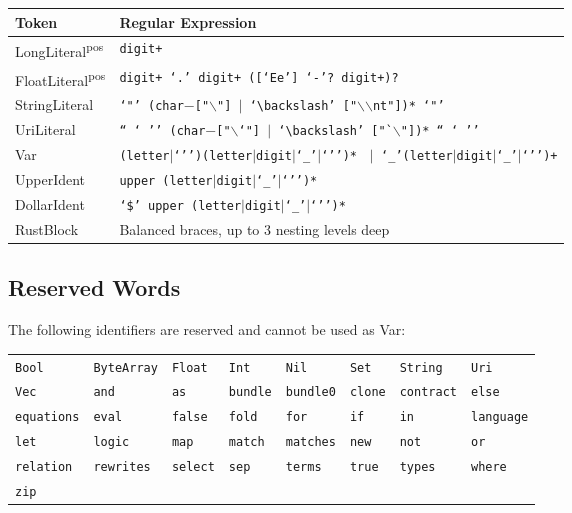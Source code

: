 \documentclass[11pt,a4paper]{article}
\newcommand{\kw}[1]{\texttt{\textcolor{kw}{#1}}}       %
\newcommand{\tok}[1]{\textsf{#1}}                       %
\newcommand{\OR}{\ensuremath{\;\mid\;}}                  %
\begin{document}
\begin{longtable}{@{}lp{10cm}@{}}
\toprule
\textbf{Token} & \textbf{Regular Expression} \\
\midrule
\endhead
\tok{LongLiteral}\textsuperscript{pos}
  & \texttt{digit+} \\[4pt]
\tok{FloatLiteral}\textsuperscript{pos}
  & \texttt{digit+ `.' digit+ ({[}`Ee'{]} `-'? digit+)?} \\[4pt]
\tok{StringLiteral}
  & \texttt{`"' (char$-${[}"$\backslash$"{]}~$|$~`$\backslash$' {[}"$\backslash$$\backslash$nt"{]})* `"'} \\[4pt]
\tok{UriLiteral}
  & \texttt{`` ` '' (char$-${[}"$\backslash$`"{]}~$|$~`$\backslash$' {[}"`$\backslash$"{]})* `` ` ''} \\[4pt]
\tok{Var}
  & \texttt{(letter$|$`'')(letter$|$digit$|$`\_'$|$`'')*}
    \OR \texttt{`\_'(letter$|$digit$|$`\_'$|$`'')+} \\[4pt]
\tok{UpperIdent}
  & \texttt{upper\,(letter$|$digit$|$`\_'$|$`'')*} \\[4pt]
\tok{DollarIdent}
  & \texttt{`\$'\,upper\,(letter$|$digit$|$`\_'$|$`'')*} \\[4pt]
\tok{RustBlock}
  & Balanced braces, up to 3 nesting levels deep \\
\bottomrule
\end{longtable}

\subsection{Reserved Words}

The following identifiers are reserved and cannot be used as \tok{Var}:

\medskip
\begin{tabular}{@{}llllllll@{}}
\kw{Bool}    & \kw{ByteArray} & \kw{Float}   & \kw{Int}       & \kw{Nil}    & \kw{Set}      & \kw{String} & \kw{Uri}      \\
\kw{Vec}     & \kw{and}       & \kw{as}      & \kw{bundle}    & \kw{bundle0}& \kw{clone}    & \kw{contract}& \kw{else}     \\
\kw{equations}& \kw{eval}     & \kw{false}   & \kw{fold}      & \kw{for}    & \kw{if}       & \kw{in}     & \kw{language} \\
\kw{let}     & \kw{logic}     & \kw{map}     & \kw{match}     & \kw{matches}& \kw{new}      & \kw{not}    & \kw{or}       \\
\kw{relation}& \kw{rewrites}  & \kw{select}  & \kw{sep}       & \kw{terms}  & \kw{true}     & \kw{types}  & \kw{where}    \\
\kw{zip}     &                &              &                &             &               &             &               \\
\end{tabular}
\end{document}
